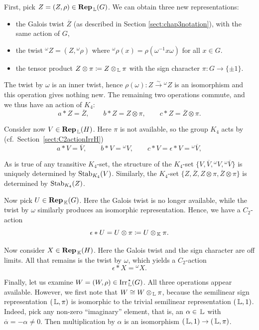 First, pick $Z = (Z,\rho) \in \operatorname{\mathbf{Rep}}_{\, {\mathbb L}}(G)$. We can obtain three new representations:
\begin{itemize}
\item the Galois twist $\overline{Z}$ (as described in Section \ref{sect:chap3notation}), with the same action of $G$,
\item the twist ${}^{\omega}{Z} = (Z,{}^{\omega}\rho)$ where ${}^{\omega}\rho (x) = \rho (\omega^{-1} x \omega)$ for all $x\in G$. 
\item the tensor product $Z \otimes \pi \coloneqq Z \otimes_{\, {\mathbb L}} \pi$ with the sign character $\pi : G \to \{ \pm 1\}$. 
\end{itemize}  
The twist by $\omega$ is an inner twist, hence $\rho(\omega) \colon Z \xrightarrow{\sim} {}^{\omega}{Z}$ is an isomorphism and this operation gives nothing new. The remaining two operations commute, and we thus have an action of $K_4$:
\[
    a * Z = \overline{Z}, \qquad b*Z = Z \otimes \pi, \qquad c * Z = \overline{Z} \otimes \pi.
    \]

Consider now $V \in \operatorname{\mathbf{Rep}}_{\, {\mathbb L}}(H)$. Here $\pi$ is not available, so the group $K_4$ acts by (cf.\ Section~\ref{sect:C2actionIrrH})
\[
    a * V = \overline{V}, \qquad b * V = {}^{\omega} V, \qquad c * V = \epsilon * V = {}^{\omega}\overline{V},
\]

As is true of any transitive $K_4$-set, the structure of the $K_4$-set $\{V, \overline{V}, {}^{\omega} V, {}^{\omega} \overline{V}\}$ is uniquely determined by $\operatorname{Stab}_{K_4}(V)$. Similarly, the $K_4$-set $\{Z, \overline{Z}, Z \otimes \pi, \overline{Z} \otimes \pi\}$ is determined by $\operatorname{Stab}_{K_4}(Z)$.

Now pick $U  \in \operatorname{\mathbf{Rep}}_{\, {\mathbb K}}(G)$. Here the Galois twist is no longer available, while the twist by $\omega$ similarly produces an isomorphic representation. Hence, we have a $C_2$-action
\[
    \epsilon  * U =  U \otimes \pi \coloneqq U \otimes_{\, {\mathbb K}} \pi.
    \]

    Now consider $X  \in \operatorname{\mathbf{Rep}}_{\, {\mathbb K}}(H)$. Here the Galois twist and the sign character are off limits.
All that remains is the twist by $\omega$, which yields a $C_2$-action
\[
    \epsilon  * X =  {}^{\omega}X.
    \]

    Finally, let us examine $W = (W,\rho) \in {\operatorname{Irr}_{\, {\mathbb L}}^{\hspace{0.1em} \star}(G)}$. All three operations appear available.
    However, we first note that $W \cong W \otimes_{\, {\mathbb L}} \pi$, because the semilinear sign representation $(\, {\mathbb L}, \pi)$ is isomorphic to the trivial semilinear representation $(\, {\mathbb L}, 1)$.
    Indeed, pick any non-zero ``imaginary'' element, that is, an $\alpha\in \, {\mathbb L}$ with $\overline{\alpha} = - \alpha \neq 0$. Then multiplication by $\alpha$ is an isomorphism $(\, {\mathbb L}, 1)\to (\, {\mathbb L}, \pi)$.


